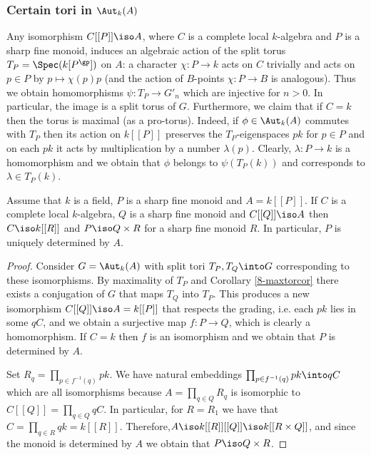 \documentclass[10pt]{../fichiers-configuration-latex/smfart}
\begin{document}
\subsubsection{Certain tori in $\Aut_k(A)$}\label{8-torisec}
Any isomorphism $C[[P]]\iso A$, where $C$ is a complete
local $k$-algebra and $P$ is a sharp fine monoid, induces an
algebraic action of the split torus $T_P=\Spec(k[P^\gp])$ on $A$:
a character $\chi{\colon}P\to k$ acts on $C$ trivially and acts
on $p\in P$ by $p\mapsto \chi(p)p$ (and the action of $B$-points
$\chi{\colon}P\to B$ is analogous). Thus we obtain homomorphisms
$\psi{\colon}T_P\to G'_n$ which are injective for $n>0$. In
particular, the image is a split torus of $G$. Furthermore, we claim
that if $C=k$ then the torus is maximal (as a pro-torus). Indeed, if
$\phi\in\Aut_k(A)$ commutes with $T_P$ then its action on $k[[P]]$
preserves the $T_P$-eigenspaces $pk$ for $p\in P$ and on each
$pk$ it acts by multiplication by a number $\lambda(p)$. Clearly,
$\lambda{\colon}P\to k$ is a homomorphism and we obtain that $\phi$
belongs to $\psi(T_P(k))$ and corresponds to $\lambda\in T_P(k)$.

\begin{theorem2}\label{8-toritheor} Assume that $k$ is a field,
$P$ is a sharp fine monoid and $A=k[[P]]$. If $C$ is a complete
local $k$-algebra, $Q$ is a sharp fine monoid and $C[[Q]]\iso A$
then $C\iso k[[R]]$ and $P\iso Q\times R$ for a sharp fine
monoid $R$. In particular, $P$ is uniquely determined by $A$.
\end{theorem2} \begin{proof} Consider $G=\Aut_k(A)$ with split tori
$T_P,T_Q\into G$ corresponding to these isomorphisms. By maximality
of $T_P$ and Corollary \ref{8-maxtorcor} there exists a conjugation
of $G$ that maps $T_Q$ into $T_P$. This produces a new isomorphism
$C[[Q]]\iso A=k[[P]]$ that respects the grading, i.e. each $pk$
lies in some $qC$, and we obtain a surjective map $f{\colon}P\to Q$,
which is clearly a homomorphism. If $C=k$ then $f$ is an isomorphism
and we obtain that $P$ is determined by $A$.

Set $R_q=\prod_{p\in f^{-1}(q)}pk$. We have natural embeddings
$\prod_{p\in f^{-1}(q)}pk\into qC$ which are all isomorphisms
because $A=\prod_{q\in Q} R_q$ is isomorphic to $C[[Q]]=\prod_{q\in
Q}qC$. In particular, for $R=R_1$ we have that $C=\prod_{q\in R}
qk=k[[R]]$. Therefore,\linebreak[4] $A\iso k[[R]][[Q]]\iso k[[R\times Q]]$,
and since the monoid is determined by $A$ we obtain that $P\iso
Q\times R$.  \end{proof}
\end{document}
